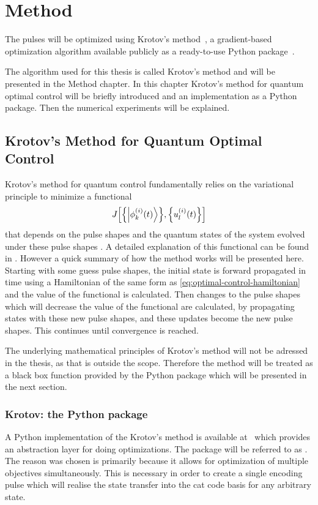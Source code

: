 \documentclass[main.tex]{subfiles}
\begin{document}
\chapter{Method}
The pulses will be optimized using Krotov's method~\cite{reich_monotonically_2012}, a gradient-based optimization algorithm available publicly as a ready-to-use Python package~\cite{goerz_krotov:_2019}.

The algorithm used for this thesis is called Krotov's method and will be presented in the Method chapter.
In this chapter Krotov's method for quantum optimal control will be briefly introduced and an implementation as a Python package.
Then the numerical experiments will be explained.

\section{Krotov's Method for Quantum Optimal Control}
Krotov's method for quantum control fundamentally relies on the variational principle to minimize a functional
\[ J\qty[\qty{\ket{\phi^{(i)}_k(t)}},\qty{u_l^{(i)}(t)}] \]
that depends on the pulse shapes and the quantum states of the system evolved under these pulse shapes \cite{goerz_krotov:_2019}.
A detailed explanation of this functional can be found in \cite{reich_monotonically_2012}.
However a quick summary of how the method works will be presented here.
Starting with some guess pulse shapes, the initial state is forward propagated in time using a Hamiltonian of the same form as \cref{eq:optimal-control-hamiltonian} and the value of the functional is calculated.
Then changes to the pulse shapes which will decrease the value of the functional are calculated, by propagating states with these new pulse shapes, and these updates become the new pulse shapes.
This continues until convergence is reached.

The underlying mathematical principles of Krotov's method will not be adressed in the thesis, as that is outside the scope.
Therefore the method will be treated as a black box function provided by the Python package which will be presented in the next section.

\subsection{Krotov: the Python package}
A Python implementation of the Krotov's method is available at~\cite{goerz_krotov:_2019} which provides an abstraction layer for doing optimizations.
The package will be referred to as \krotov{}.
The reason \krotov{} was chosen is primarily because it allows for optimization of multiple objectives simultaneously.
This is necessary in order to create a single encoding pulse which will realise the state transfer into the cat code basis for any arbitrary state.
\end{document}
